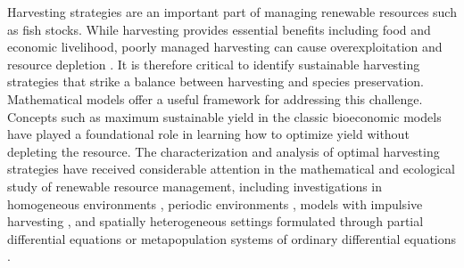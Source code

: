 \documentclass[11pt]{article}
\theoremstyle{definition}
\begin{document}
Harvesting strategies are an important part of managing renewable resources such as fish stocks. While harvesting provides essential benefits including food and economic livelihood, poorly managed harvesting can cause overexploitation and resource depletion \cite{hilborn2011overfishing, agriculture2018state}. It is therefore critical to identify sustainable harvesting strategies that strike a balance between harvesting and species preservation. Mathematical models offer a useful framework for addressing this challenge. Concepts such as maximum sustainable yield in the classic bioeconomic models \cite{clark2005mathematical, gordon1954, schaefer1954} have played a foundational role in learning how to optimize yield without depleting the resource. The characterization and analysis of optimal harvesting strategies have received considerable attention in the mathematical and ecological study of renewable resource management, including investigations in homogeneous environments \cite{brauer1975constant,brauer1976constant,brauer1979harvesting, dunkel1970maximum, dunkel2006maximum,swan1975some, wan1983optimal}, periodic environments \cite{dong2007optimal,fan1998optimal, feng2023periodic, liu2022optimal, xiao2006optimal, xu2005harvesting}, models with impulsive harvesting \cite{angelova2000optimization,berezansky2004impulsive,braverman2008continuous,cid2014harvest,shuai2007optimization,tang2006optimal,zhang2003optimal,zhang2006optimal}, and spatially heterogeneous settings formulated through partial differential equations \cite{bai2005gilpin, braverman2009optimal, cui2017effect, ding2009optimal,herrera2010spatial, kelly2016optimal, kelly2019marine, korobenko2009logistic, korobenko2013persistence, neubert2003marine, oruganti2002diffusive} or metapopulation systems of ordinary differential equations \cite{auger2022increase,elbetch2023nonlinear,gao2022total,gonzalez2011two, nguyen2024connectivity, pilyugin2016effectiveness, reurik2025connectivity, supriatna1999harvesting, takashina2015maximum, tuck2000marine, wu2020dispersal,zhang2015effects}. 
\end{document}
